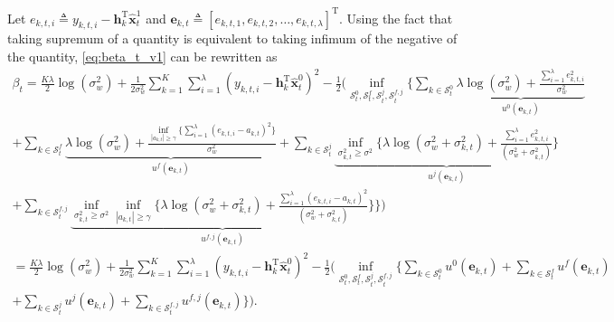 \documentclass[onecolumn]{IEEEtran}
\def\inf{\mathop{\mathrm{inf}}}
\begin{document}
Let $e_{k,t,i} \triangleq y_{k,t,i} - \mathbf{h}_k^\mathrm{T} \hat{\mathbf{x}}_t^1$ and $\mathbf{e}_{k,t} \triangleq [e_{k,t,1}, e_{k,t,2}, \dots, e_{k,t,\lambda}]^\mathrm{T}$. Using the fact that taking supremum of a quantity is equivalent to taking infimum of the negative of the quantity, \eqref{eq:beta_t_v1} can be rewritten as
\begin{gather} \nonumber
\beta_t = \frac{K \lambda}{2} \log(\sigma_w^2) + \frac{1}{2 \sigma_w^2} \sum_{k=1}^{K} \sum_{i=1}^{\lambda} (y_{k,t,i} - \mathbf{h}_k^\mathrm{T} \hat{\mathbf{x}}_t^0)^2
- \frac{1}{2} \Bigg( \inf_{\mathcal{S}_t^0,\mathcal{S}_t^f,\mathcal{S}_t^j,\mathcal{S}_t^{f,j}} \bigg\{ \sum_{k \in \mathcal{S}_t^0} \underbrace{\lambda \log(\sigma_w^2) + \frac{\sum_{i=1}^{\lambda} e_{k,t,i}^2}{\sigma_w^2}}_{u^0(\mathbf{e}_{k,t})} \\ \nonumber
+ \sum_{k \in \mathcal{S}_t^f} \underbrace{\lambda \log(\sigma_w^2) + \frac{\inf_{|a_{k,t}| \geq \gamma} \big\{ \sum_{i=1}^{\lambda} (e_{k,t,i} - a_{k,t})^2 \big\}}{\sigma_w^2} }_{u^f(\mathbf{e}_{k,t})}
+ \sum_{k \in \mathcal{S}_t^j} \underbrace{ \inf_{\sigma_{k,t}^2 \geq \sigma^2} \Big\{ \lambda \log(\sigma_w^2 + \sigma_{k,t}^2) + \frac{ \sum_{i=1}^{\lambda} e_{k,t,i}^2}{(\sigma_w^2 + \sigma_{k,t}^2)} \Big\} }_{u^j(\mathbf{e}_{k,t})} \\ \label{eq:beta_tmp}
+ \sum_{k \in \mathcal{S}_t^{f,j}} \underbrace{ \inf_{\sigma_{k,t}^2 \geq \sigma^2} \inf_{|a_{k,t}| \geq \gamma} \Big\{ \lambda \log(\sigma_w^2 + \sigma_{k,t}^2) + \frac{\sum_{i=1}^{\lambda} (e_{k,t,i} - a_{k,t})^2}{(\sigma_w^2 + \sigma_{k,t}^2)} \Big\} }_{u^{f,j}(\mathbf{e}_{k,t})} \bigg\}  \Bigg) \\ \nonumber
=  \frac{K \lambda}{2} \log(\sigma_w^2) + \frac{1}{2 \sigma_w^2} \sum_{k=1}^{K} \sum_{i=1}^{\lambda} (y_{k,t,i} - \mathbf{h}_k^\mathrm{T} \hat{\mathbf{x}}_t^0)^2
- \frac{1}{2} \Bigg( \inf_{\mathcal{S}_t^0,\mathcal{S}_t^f,\mathcal{S}_t^j,\mathcal{S}_t^{f,j}} \bigg\{ \sum_{k \in \mathcal{S}_t^0} u^0(\mathbf{e}_{k,t}) + \sum_{k \in \mathcal{S}_t^f} u^f(\mathbf{e}_{k,t}) \\ \label{eq:beta_t_v2} \nonumber
+ \sum_{k \in \mathcal{S}_t^j} u^j(\mathbf{e}_{k,t}) + \sum_{k \in \mathcal{S}_t^{f,j}} u^{f,j}(\mathbf{e}_{k,t})  \bigg\}  \Bigg).
\end{gather}
\end{document}
